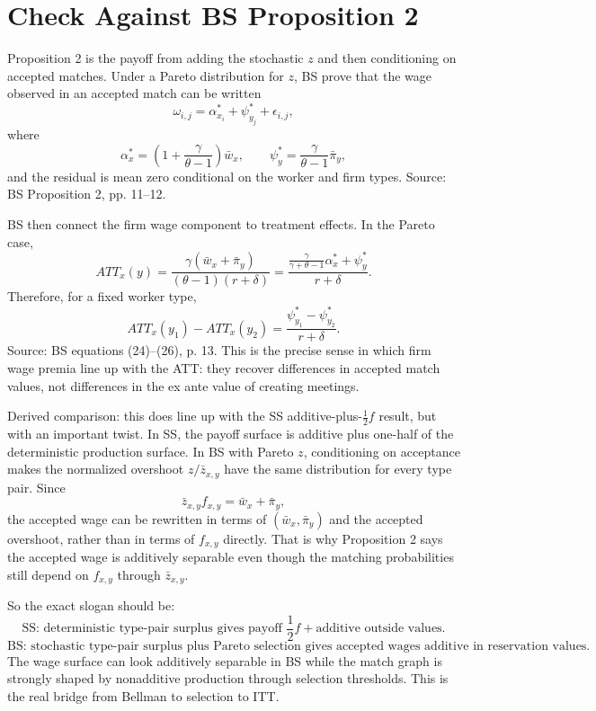 \documentclass[11pt]{article}
\begin{document}
\section{Check Against BS Proposition 2}

Proposition 2 is the payoff from adding the stochastic $z$ and then conditioning
on accepted matches. Under a Pareto distribution for $z$, BS prove that the wage
observed in an accepted match can be written
\[
\omega_{i,j}
=
\alpha^*_{x_i}+\psi^*_{y_j}+\epsilon_{i,j},
\]
where
\[
\alpha^*_x
=
\left(1+\frac{\gamma}{\theta-1}\right)\bar w_x,
\qquad
\psi^*_y
=
\frac{\gamma}{\theta-1}\bar\pi_y,
\]
and the residual is mean zero conditional on the worker and firm types. Source:
BS Proposition 2, pp. 11--12.

BS then connect the firm wage component to treatment effects. In the Pareto
case,
\[
ATT_x(y)
=
\frac{\gamma(\bar w_x+\bar\pi_y)}{(\theta-1)(r+\delta)}
=
\frac{\frac{\gamma}{\gamma+\theta-1}\alpha^*_x+\psi^*_y}{r+\delta}.
\]
Therefore, for a fixed worker type,
\[
ATT_x(y_1)-ATT_x(y_2)
=
\frac{\psi^*_{y_1}-\psi^*_{y_2}}{r+\delta}.
\]
Source: BS equations (24)--(26), p. 13. This is the precise sense in which
firm wage premia line up with the ATT: they recover differences in accepted
match values, not differences in the ex ante value of creating meetings.

Derived comparison: this does line up with the SS additive-plus-$\frac12 f$ result, but with an
important twist. In SS, the payoff surface is additive plus one-half of the
deterministic production surface. In BS with Pareto $z$, conditioning on
acceptance makes the normalized overshoot $z/\bar z_{x,y}$ have the same
distribution for every type pair. Since
\[
\bar z_{x,y}f_{x,y}=\bar w_x+\bar\pi_y,
\]
the accepted wage can be rewritten in terms of $(\bar w_x,\bar\pi_y)$ and the
accepted overshoot, rather than in terms of $f_{x,y}$ directly. That is why
Proposition 2 says the accepted wage is additively separable even though the
matching probabilities still depend on $f_{x,y}$ through $\bar z_{x,y}$.

So the exact slogan should be:
\[
\text{SS: deterministic type-pair surplus gives payoff } 
\frac12 f+\text{additive outside values.}
\]
\[
\text{BS: stochastic type-pair surplus plus Pareto selection gives accepted wages }
\text{additive in reservation values.}
\]
The wage surface can look additively separable in BS while the match graph is
strongly shaped by nonadditive production through selection thresholds. This is
the real bridge from Bellman to selection to ITT.
\end{document}
